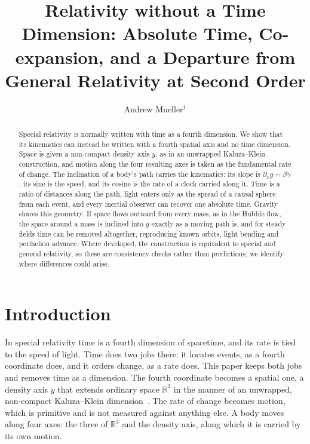 \documentclass[anonymous]{iopjournal}
\begin{document}

\title{Relativity without a Time Dimension: Absolute Time, Co-expansion, and a Departure from General Relativity at Second Order}

\author{Andrew Mueller$^1$}




\begin{abstract}
Special relativity is normally written with time as a fourth dimension. We show that its kinematics can instead be written with a fourth spatial axis and no time dimension. Space is given a non-compact density axis $y$, as in an unwrapped Kaluza--Klein construction, and motion along the four resulting axes is taken as the fundamental rate of change. The inclination of a body's path carries the kinematics: its slope is $\partial_x y=\beta\gamma$, its sine is the speed, and its cosine is the rate of a clock carried along it. Time is a ratio of distances along the path, light enters only as the spread of a causal sphere from each event, and every inertial observer can recover one absolute time. Gravity shares this geometry. If space flows outward from every mass, as in the Hubble flow, the space around a mass is inclined into $y$ exactly as a moving path is, and for steady fields time can be removed altogether, reproducing known orbits, light bending and perihelion advance. Where developed, the construction is equivalent to special and general relativity, so these are consistency checks rather than predictions; we identify where differences could arise.
\end{abstract}

\section{Introduction}\label{sec1}

In special relativity time is a fourth dimension of spacetime, and its rate is tied to the speed of light. Time does two jobs there: it locates events, as a fourth coordinate does, and it orders change, as a rate does. This paper keeps both jobs and removes time as a dimension. The fourth coordinate becomes a spatial one, a density axis $y$ that extends ordinary space $\mathbb{R}^3$ in the manner of an unwrapped, non-compact Kaluza--Klein dimension~\cite{Kaluza1921, Klein1926}. The rate of change becomes motion, which is primitive and is not measured against anything else. A body moves along four axes: the three of $\mathbb{R}^3$ and the density axis, along which it is carried by its own motion.
\end{document}
